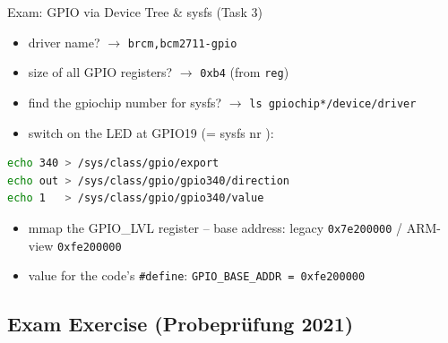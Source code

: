 \begin{example2}{Exam: GPIO via Device Tree \& sysfs (Task 3)}
    \begin{itemize}
        \item driver name? $\to$ \texttt{brcm,bcm2711-gpio}
        \item size of all GPIO registers? $\to$ \texttt{0xb4} (from \texttt{reg})
        \item find the gpiochip number for sysfs? $\to$
              \texttt{ls gpiochip*/device/driver}
        \item switch on the LED at GPIO19 (= sysfs nr ):
    \end{itemize}
\begin{lstlisting}[language=bash, style=basesmol, aboveskip=2pt, belowskip=2pt]
echo 340 > /sys/class/gpio/export
echo out > /sys/class/gpio/gpio340/direction
echo 1   > /sys/class/gpio/gpio340/value
\end{lstlisting}
    \begin{itemize}
        \item mmap the GPIO\_LVL register -- base address:
              legacy \texttt{0x7e200000} / ARM-view \texttt{0xfe200000}
        \item value for the code's \texttt{\#define}:
              \texttt{GPIO\_BASE\_ADDR = 0xfe200000}
    \end{itemize}
\end{example2}

\subsection{Exam Exercise (Probepr\"ufung 2021)}

